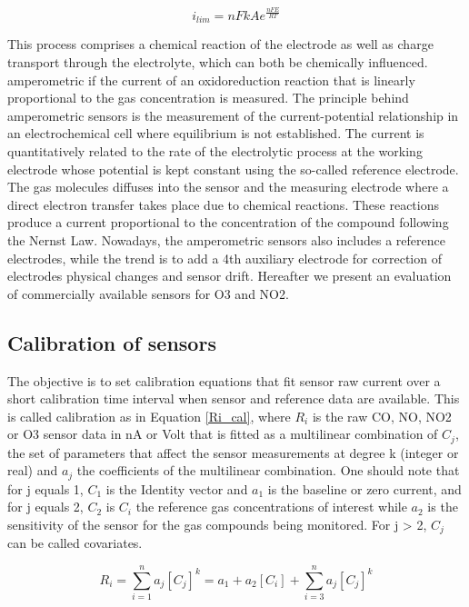 \documentclass[sensors,article,submit,moreauthors,pdftex]{mdpi}
\begin{document}
\begin{equation}
i_{lim} =  nFkA e^{\frac {nFE}{RT}} 
\label{ilim_exp}
\end{equation}

This process comprises a chemical reaction of the electrode as well as
charge transport through the electrolyte, which can both be chemically
influenced. amperometric if the current of an oxidoreduction reaction
that is linearly proportional to the gas concentration is measured. The
principle behind amperometric sensors is the measurement of the
current-potential relationship in an electrochemical cell where
equilibrium is not established. The current is quantitatively related to
the rate of the electrolytic process at the working electrode whose
potential is kept constant using the so-called reference electrode. The
gas molecules diffuses into the sensor and the measuring electrode where
a direct electron transfer takes place due to chemical reactions. These
reactions produce a current proportional to the concentration of the
compound \citep{knake_amperometric_2005} following the Nernst Law.
Nowadays, the amperometric sensors also includes a reference electrodes,
while the trend is to add a 4th auxiliary electrode for correction of
electrodes physical changes and sensor drift. Hereafter we present an
evaluation of commercially available sensors for O3 and NO2.

\subsection{Calibration of sensors}\label{calibration-of-sensors}

The objective is to set calibration equations that fit sensor raw
current over a short calibration time interval when sensor and reference
data are available. This is called calibration as in Equation
\eqref{Ri_cal}, where \(R_i\) is the raw CO, NO, NO2 or O3 sensor data
in nA or Volt that is fitted as a multilinear combination of \(C_j\),
the set of parameters that affect the sensor measurements at degree k
(integer or real) and \(a_j\) the coefficients of the multilinear
combination. One should note that for j equals 1, \(C_1\) is the
Identity vector and \(a_1\) is the baseline or zero current, and for j
equals 2, \(C_2\) is \(C_i\) the reference gas concentrations of
interest while \(a_2\) is the sensitivity of the sensor for the gas
compounds being monitored. For j \textgreater{} 2, \(C_j\) can be called
covariates.

\begin{equation}
R_i = \sum_{i=1}^{n} a_j [C_j]^k = a_1 + a_2[C_i] + \sum_{i=3}^{n} a_j [C_j]^k 
\label{Ri_cal}
\end{equation}
\end{document}
